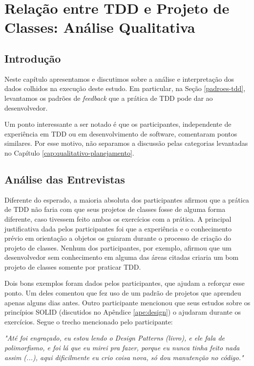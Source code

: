 \chapter{Relação entre TDD e Projeto de Classes: Análise Qualitativa}
\label{cap:discussao}

\section{Introdução}

Neste capítulo apresentamos e discutimos sobre a análise e interpretação dos dados colhidos
na execução deste estudo. Em particular, na Seção 
\ref{padroes-tdd}, levantamos os padrões de \textit{feedback} que a prática de TDD
pode dar ao desenvolvedor.

Um ponto interessante a ser notado é que os participantes, independente de experiência
em TDD ou em desenvolvimento de software, comentaram pontos similares. Por esse motivo,
não separamos a discussão pelas categorias levantadas no Capítulo \ref{cap:qualitativo-planejamento}.

\section{Análise das Entrevistas}

Diferente do esperado, a maioria absoluta dos participantes afirmou que 
a prática de TDD não faria com que seus projetos de classes fosse de alguma forma diferente, caso tivessem
feito ambos os exercícios com a prática.
A principal justificativa dada pelos participantes foi que a experiência e o conhecimento prévio
em orientação a objetos os guiaram durante o processo de criação do projeto de classes. Nenhum dos
participantes, por exemplo, afirmou que um desenvolvedor sem conhecimento em alguma das áreas
citadas criaria um bom projeto de classes somente por praticar TDD.

Dois bons exemplos foram dados pelos participantes, que ajudam a reforçar esse ponto. Um deles
comentou que fez uso de um padrão de projetos \cite{gof} que aprendeu apenas alguns dias antes.
Outro participante mencionou que seus estudos sobre os princípios SOLID (discutidos no Apêndice \ref{ape:design})
o ajudaram durante os exercícios. Segue o trecho mencionado pelo participante:

\begin{framed}
\textit{"Até foi engraçado, eu estou lendo o Design Patterns (livro), e ele fala de polimorfismo, e foi
lá que eu mirei pra fazer, porque eu nunca tinha feito nada assim (...), aqui dificilmente eu crio
coisa nova, só dou manutenção no código."}
\end{framed}

